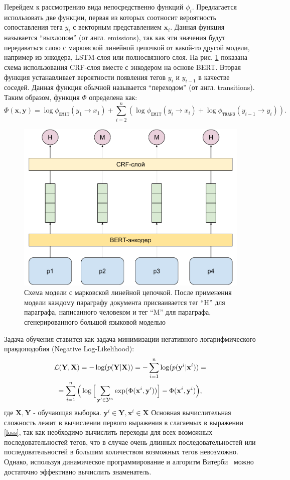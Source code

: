 Перейдем к рассмотрению вида непосредственно функций $\phi_i$. Предлагается использовать две функции, первая из которых соотносит вероятность сопоставления тега $y_i$ с векторным представлением $\mathbf{x}_i$. Данная функция называется ``выхлопом'' (от англ. emissions), так как эти значения будут передаваться слою с марковской линейной цепочкой от какой-то другой модели, например из энкодера, LSTM-слоя или полносвязного слоя. На рис. \ref{BERT_CRF} показана схема использования CRF-слоя вместе с энкодером на основе BERT. Вторая функция устанавливает вероятности  появления тегов $y_i$ и $y_{i-1}$ в качестве соседей. Данная функция обычной называется ``переходом'' (от англ. transitions). Таким образом, функция $\Phi$ определена как:
\begin{equation}
\label{phi}
\Phi(\mathbf{x}, \mathbf{y}) = \log \phi_{\texttt{EMIT}} (y_1 \rightarrow x_1) + \sum\limits_{i=2}^{n} (\log \phi_{\texttt{EMIT}} (y_i \rightarrow x_i) + \log \phi_{\texttt{TRANS}} (y_{i - 1} \rightarrow y_i)).
\end{equation}
\begin{figure}[t!] %
\centering
\includegraphics[width=0.7\linewidth]{images/BERT_CRF.pdf}
\caption{Схема модели с марковской линейной цепочкой. После применения модели каждому параграфу документа присваивается тег ``H'' для параграфа, написанного человеком и тег ``M'' для параграфа, сгенерированного большой языковой моделью}
\label{BERT_CRF}
\end{figure}


Задача обучения ставится как задача минимизации негативного логарифмического правдоподобия (Negative Log-Likelihood):
\begin{multline}
\label{loss}
    \mathcal{L}(\mathbf{Y}, \mathbf{X}) = - \log(p(\mathbf{Y} | \mathbf{X})) = - \sum\limits_{i = 1}^{n} \log(p(\mathbf{y}^i | \mathbf{x}^i)) = 
\cr = \sum\limits_{i = 1}^{n}  \Big(\log \Big [\sum\limits_{\mathbf{y}' \in \mathcal{Y}^n}\exp(\Phi(\mathbf{x}^i,\mathbf{y}'))\Big] - \Phi(\mathbf{x}^i, \mathbf{y}^i)\Big),
\end{multline}
где $\mathbf{X}, \mathbf{Y}$ - обучающая выборка. $\mathbf{y}^i \in \mathbf{Y}, \mathbf{x}^i \in \mathbf{X}$
Основная вычислительная сложность лежит в вычислении первого выражения в слагаемых в выражении \ref{loss}, так как необходимо вычислить переходы для всех возможных последовательностей тегов, что в случае очень длинных последовательностей или последовательностей в большим количеством возможных тегов невозможно. Однако, используя динамическое программирование и алгоритм Витерби~\cite{Viterbi} можно достаточно эффективно вычислить знаменатель.

